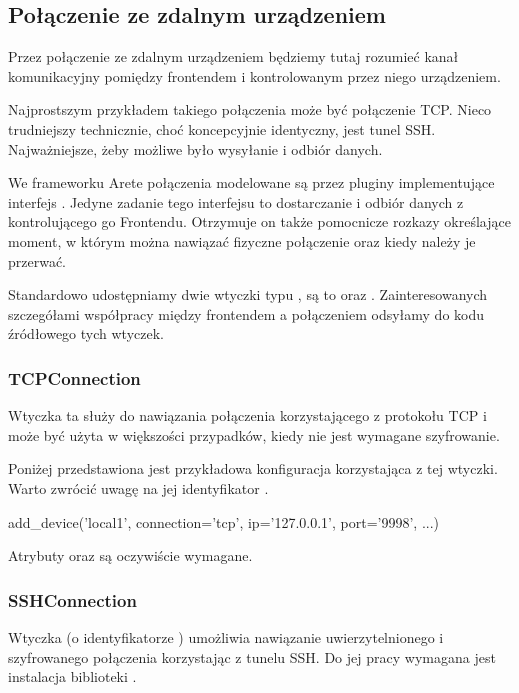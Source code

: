 \documentclass[00-praca-magisterska.tex]{subfiles}
\begin{document}
\subsection{Połączenie ze zdalnym urządzeniem}

Przez połączenie ze zdalnym urządzeniem będziemy tutaj rozumieć kanał
komunikacyjny pomiędzy frontendem i kontrolowanym przez niego urządzeniem.

Najprostszym przykładem takiego połączenia może być połączenie TCP. Nieco
trudniejszy technicznie, choć koncepcyjnie identyczny, jest tunel SSH.
Najważniejsze, żeby możliwe było wysyłanie i odbiór danych.

We frameworku Arete połączenia modelowane są przez pluginy implementujące
interfejs . Jedyne zadanie tego interfejsu to
dostarczanie i odbiór danych z kontrolującego go Frontendu. Otrzymuje on także
pomocnicze rozkazy określające moment, w którym można nawiązać fizyczne
połączenie oraz kiedy należy je przerwać.

Standardowo udostępniamy dwie wtyczki typu , są to
 oraz . Zainteresowanych szczegółami
współpracy między frontendem a połączeniem odsyłamy do kodu źródłowego tych
wtyczek.

\subsubsection{TCPConnection}

Wtyczka ta służy do nawiązania połączenia korzystającego z protokołu TCP i może
być użyta w większości przypadków, kiedy nie jest wymagane szyfrowanie.

Poniżej przedstawiona jest przykładowa konfiguracja korzystająca z tej wtyczki.
Warto zwrócić uwagę na jej identyfikator .

\begin{pythoncode}
  add_device('local1',
    connection='tcp',
    ip='127.0.0.1',
    port='9998',
    ...)
\end{pythoncode}

Atrybuty  oraz  są oczywiście wymagane.

\subsubsection{SSHConnection}

Wtyczka  (o identyfikatorze ) umożliwia
nawiązanie uwierzytelnionego i szyfrowanego połączenia korzystając z tunelu
SSH. Do jej pracy wymagana jest instalacja biblioteki .
\end{document}
